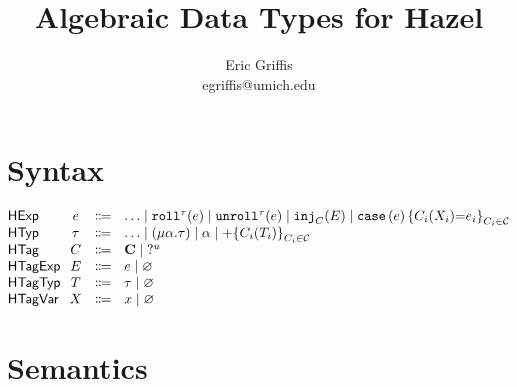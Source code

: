 \documentclass{article}
\title{Algebraic Data Types for Hazel}
\author{Eric Griffis \\ egriffis@umich.edu}
\date{}
\newcommand{\HExp}{\mathsf{HExp}}
\newcommand{\HTyp}{\mathsf{HTyp}}
\newcommand{\HTag}{\mathsf{HTag}}
\newcommand{\HTagExp}{\mathsf{HTagExp}}
\newcommand{\HTagTyp}{\mathsf{HTagTyp}}
\newcommand{\HTagVar}{\mathsf{HTagVar}}
\newcommand{\rectype}[2]{\mu #1.#2}
\newcommand{\sumtype}[1]{+\mathopen{}\left\{#1\right\}}
\newcommand{\C}{\mathcal{C}}
\newcommand{\Tag}{\mathbf{C}}
\newcommand{\TagHole}[1][u]{{?^{#1}}}
\newcommand{\roll}[2]{\mathtt{roll}^{#1}\mathopen{}\left(#2\right)\mathclose{}}
\newcommand{\unroll}[2]{\mathtt{unroll}^{#1}\mathopen{}\left(#2\right)\mathclose{}}
\newcommand{\inj}[2]{\mathtt{inj}_{#1}\mathopen{}\left(#2\right)\mathclose{}}
\newcommand{\case}[2]{\mathtt{case} \left(#1\right) \left\{#2\right\}}
\begin{document}
\maketitle


\section{Syntax}

\[
  \arraycolsep=0pt  \arraycolsep=0pt
  \begin{array}{l@{~~}c@{~~}c@{~~}l}
    \HExp & e & {}\Coloneqq{} & \ldots
      \mid \roll{\tau}{e}
      \mid \unroll{\tau}{e}
      \mid \inj{C}{E}
      \mid \case{e}{C_i(X_i){=}e_i}_{C_i \in \C}
    \\
    \HTyp & \tau & {}\Coloneqq{} & \ldots
      \mid (\rectype{\alpha}{\tau})
      \mid \alpha
      \mid \sumtype{C_i(T_i)}_{C_i \in \C}
    \\
    \HTag & C & {}\Coloneqq{} &
      \Tag
      \mid \TagHole
    \\
    \HTagExp & E & {}\Coloneqq{} & e \mid \varnothing \\
    \HTagTyp & T & {}\Coloneqq{} & \tau \mid \varnothing \\
    \HTagVar & X & {}\Coloneqq{} & x \mid \varnothing \\
  \end{array}
\]


\section{Semantics}

\end{document}
